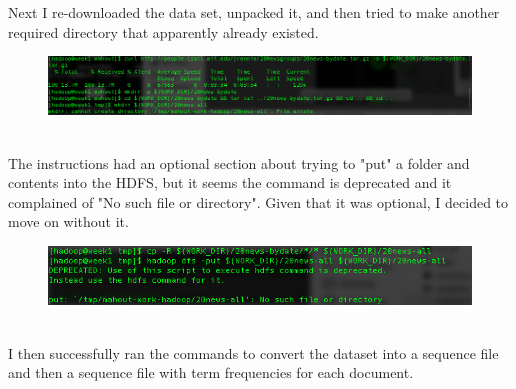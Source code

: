 \documentclass[10pt]{article}
\begin{document}
\indent Next I re-downloaded the data set, unpacked it, and then tried to make another required directory that apparently already existed. 
\begin{figure}[!h]
\includegraphics[scale=0.37]{classify3.png}
\centering
\end{figure}\\
\indent The instructions had an optional section about trying to "put" a folder and contents into the HDFS, but it seems the command is deprecated and it complained of "No such file or directory". Given that it was optional, I decided to move on without it.
\begin{figure}[!h]
\includegraphics[scale=0.37]{hadoop_put.png}
\centering
\end{figure}\\
\indent I then successfully ran the commands to convert the dataset into a sequence file and then a sequence file with term frequencies for each document.
\par
{}%
\hfill
{}%
\end{document}
